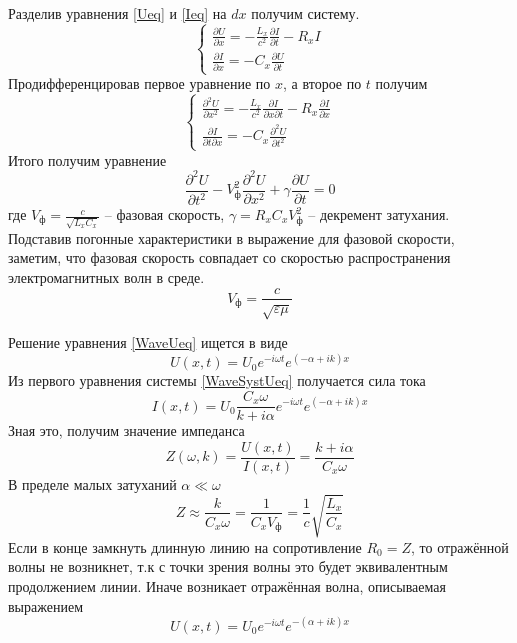 \documentclass[a4paper,12pt]{article}
\theoremstyle{definition}
\begin{document}
 	Разделив уравнения \eqref{Ueq} и \eqref{Ieq} на $dx$ получим систему.
 	\begin{equation}
 		\begin{cases}
 			\frac{\partial U}{\partial x}=-\frac{L_x}{c^2}\frac{\partial I}{\partial t}-R_xI
 			\\
 			\frac{\partial I}{\partial x}=-C_x\frac{\partial U}{\partial t}
 		\end{cases}
 	\end{equation}
 	Продифференцировав первое уравнение по $x$, а второе по $t$ получим
 	\begin{equation}\label{WaveSystUeq}
 		\begin{cases}
 			\frac{\partial^2 U}{\partial x^2}=-\frac{L_x}{c^2}\frac{\partial I}{\partial x\partial t}-R_x\frac{\partial I}{\partial x}
 			\\
 			\frac{\partial I}{\partial t\partial x}=-C_x\frac{\partial^2 U}{\partial t^2}
 		\end{cases}
 	\end{equation}
 	Итого получим уравнение
 	\begin{equation}\label{WaveUeq}
 		\frac{\partial^2 U}{\partial t^2}-V^2_\text{ф}\frac{\partial^2 U}{\partial x^2}+\gamma\frac{\partial U}{\partial t}=0
 	\end{equation}
 	где $V_\text{ф}=\frac{c}{\sqrt{L_xC_x}}$ -- фазовая скорость, $\gamma=R_xC_xV^2_\text{ф}$ -- декремент затухания. Подставив погонные характеристики в выражение для фазовой скорости, заметим, что фазовая скорость совпадает со скоростью распространения электромагнитных волн в среде.
 	\begin{equation}
 		V_\text{ф}=\frac{c}{\sqrt{\varepsilon\mu}}
 	\end{equation}
 	
 	Решение уравнения \eqref{WaveUeq} ищется в виде
 	\begin{equation}\label{WaveUsol}
 		U(x,t)=U_0e^{-i\omega t}e^{(-\alpha+ik)x}
 	\end{equation}
 	Из первого уравнения системы \eqref{WaveSystUeq} получается сила тока
 	\begin{equation}
 		I(x,t)=U_0\frac{C_x\omega}{k+i\alpha}e^{-i\omega t}e^{(-\alpha+ik)x}
 	\end{equation}
 	Зная это, получим значение импеданса
 	\begin{equation}
 		Z(\omega,k)=\frac{U(x,t)}{I(x,t)}=\frac{k+i\alpha}{C_x\omega}
 	\end{equation}
 	В пределе малых затуханий $\alpha\ll\omega$
 	\begin{equation}
 		Z\approx\frac{k}{C_x\omega}=\frac{1}{C_xV_\text{ф}}=\frac{1}{c}\sqrt{\frac{L_x}{C_x}}
 	\end{equation}
 	Если в конце замкнуть длинную линию на сопротивление $R_0=Z$, то отражённой волны не возникнет, т.к с точки зрения волны это будет эквивалентным продолжением линии. Иначе возникает отражённая волна, описываемая выражением
 	\begin{equation}
 		U(x,t)=U_0e^{-i\omega t}e^{-(\alpha+ik)x}
 	\end{equation}
 
\end{document}
